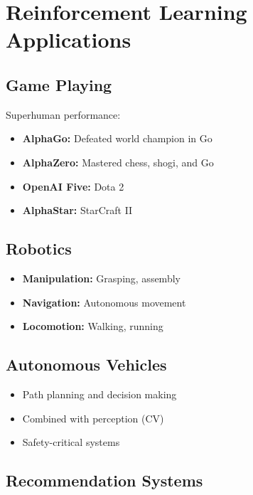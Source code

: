 
\section{Reinforcement Learning Applications}
\label{sec:rl-applications}

\subsection{Game Playing}

Superhuman performance:
\begin{itemize}
    \item \textbf{AlphaGo:} Defeated world champion in Go
    \item \textbf{AlphaZero:} Mastered chess, shogi, and Go
    \item \textbf{OpenAI Five:} Dota 2
    \item \textbf{AlphaStar:} StarCraft II
\end{itemize}

\subsection{Robotics}

\begin{itemize}
    \item \textbf{Manipulation:} Grasping, assembly
    \item \textbf{Navigation:} Autonomous movement
    \item \textbf{Locomotion:} Walking, running
\end{itemize}

\subsection{Autonomous Vehicles}

\begin{itemize}
    \item Path planning and decision making
    \item Combined with perception (CV)
    \item Safety-critical systems
\end{itemize}

\subsection{Recommendation Systems}


